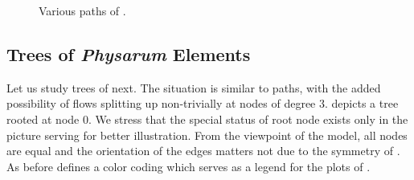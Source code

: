 		\begin{figure}
			\centering
			\qquad
			\newline
			\qquad
			\newline
			\qquad
			\newline
			\qquad
			
			\caption[Simulation - Paths]{Various paths of \Pes.}
			\label{fig:paths}
		\end{figure}

		\FloatBarrier

	\subsection{Trees of \emph{Physarum} Elements}
		
		Let us study trees of \Pes next. The situation is similar to paths, with the added possibility of flows splitting up non-trivially at nodes of degree $3$.  depicts a tree rooted at node $0$. We stress that the special status of root node exists only in the picture serving for better illustration. From the viewpoint of the model, all nodes are equal and the orientation of the edges matters not due to the symmetry of \Pes. As before  defines a color coding which serves as a legend for the plots of .

